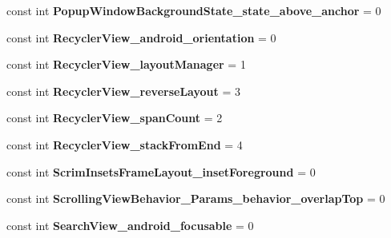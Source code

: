\begin{DoxyCompactItemize}
\mbox{\label{classXaria_1_1Resource_1_1Styleable_abf02b116db6410990197be4b35a35f98}} 
const int {\bfseries Popup\+Window\+Background\+State\+\_\+state\+\_\+above\+\_\+anchor} = 0
\item 
\mbox{\label{classXaria_1_1Resource_1_1Styleable_abd47aa699bd948be001e840eecceb90f}} 
const int {\bfseries Recycler\+View\+\_\+android\+\_\+orientation} = 0
\item 
\mbox{\label{classXaria_1_1Resource_1_1Styleable_a7ffe824715b142fc7bead969c865b2e8}} 
const int {\bfseries Recycler\+View\+\_\+layout\+Manager} = 1
\item 
\mbox{\label{classXaria_1_1Resource_1_1Styleable_af8daa47b9c12bd12c1126ee873679aa7}} 
const int {\bfseries Recycler\+View\+\_\+reverse\+Layout} = 3
\item 
\mbox{\label{classXaria_1_1Resource_1_1Styleable_ae7ac4807f4af53325d753b4be01d6fe6}} 
const int {\bfseries Recycler\+View\+\_\+span\+Count} = 2
\item 
\mbox{\label{classXaria_1_1Resource_1_1Styleable_ad4de740fb704a122eae42c9f5079123c}} 
const int {\bfseries Recycler\+View\+\_\+stack\+From\+End} = 4
\item 
\mbox{\label{classXaria_1_1Resource_1_1Styleable_ab39f27174cd05380c5fea4ce4458f524}} 
const int {\bfseries Scrim\+Insets\+Frame\+Layout\+\_\+inset\+Foreground} = 0
\item 
\mbox{\label{classXaria_1_1Resource_1_1Styleable_a620ee9e9d94e657ce2a15faa86ddcd08}} 
const int {\bfseries Scrolling\+View\+Behavior\+\_\+\+Params\+\_\+behavior\+\_\+overlap\+Top} = 0
\item 
\mbox{\label{classXaria_1_1Resource_1_1Styleable_aff5154702fdb9526093d8f0862670a44}} 
const int {\bfseries Search\+View\+\_\+android\+\_\+focusable} = 0
\item 
\mbox{\label{classXaria_1_1Resource_1_1Styleable_a324ea4008979c2637914841433d582e0}} 

\end{DoxyCompactItemize}
